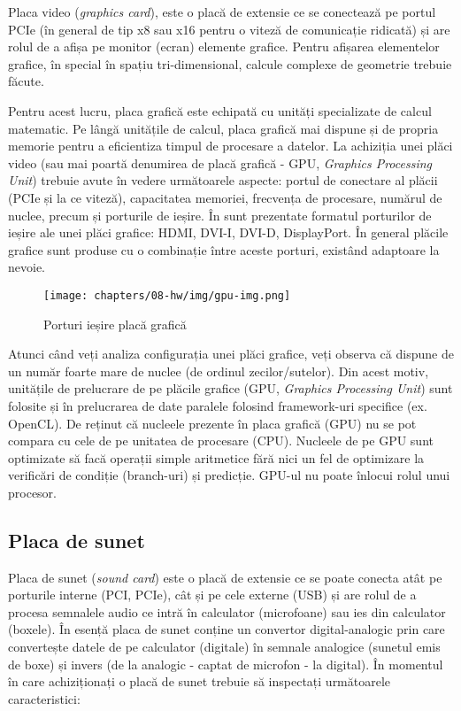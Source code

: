 Placa video (\textit{graphics card}), este o placă de extensie ce se conectează pe portul PCIe (în general
de tip x8 sau x16 pentru o viteză de comunicație ridicată) și are rolul de a
afișa pe monitor (ecran) elemente grafice. Pentru afișarea elementelor grafice,
în special în spațiu tri-dimensional, calcule complexe de geometrie trebuie
făcute.

Pentru acest lucru, placa grafică este echipată cu unități specializate
de calcul matematic. Pe lângă unitățile de calcul, placa grafică mai dispune și
de propria memorie pentru a eficientiza timpul de procesare a datelor. La
achiziția unei plăci video (sau mai poartă denumirea de placă grafică - GPU, \textit{Graphics Processing Unit}) trebuie avute în vedere următoarele
aspecte: portul de conectare al plăcii (PCIe și la ce viteză), capacitatea
memoriei, frecvența de procesare, numărul de nuclee, precum și porturile de
ieșire. În  sunt prezentate formatul
porturilor de ieșire ale unei plăci grafice: HDMI, DVI-I, DVI-D, DisplayPort. În
general plăcile grafice sunt produse cu o combinație între aceste porturi,
existând adaptoare la nevoie.

\begin{figure}[!htbp]
  \centering
  \texttt{[image: chapters/08-hw/img/gpu-img.png]}
  \caption{Porturi ieșire placă grafică\protect\footnotemark}
  \label{fig:hw:gpu}
\end{figure}

Atunci când veți analiza configurația unei plăci grafice, veți observa că
dispune de un număr foarte mare de nuclee (de ordinul zecilor/sutelor). Din
acest motiv, unitățile de prelucrare de pe plăcile grafice (GPU, \textit{Graphics Processing Unit}) sunt folosite și în prelucrarea de date
paralele folosind framework-uri specifice (ex. OpenCL). De reținut că nucleele
prezente în placa grafică (GPU) nu se pot compara cu cele de pe unitatea de
procesare (CPU). Nucleele de pe GPU sunt optimizate să facă operații simple
aritmetice fără nici un fel de optimizare la verificări de condiție (branch-uri)
și predicție. GPU-ul nu poate înlocui rolul unui procesor.

\subsection{Placa de sunet}
\label{sec:hw:extension:sound}

Placa de sunet (\textit{sound card}) este o placă de extensie ce se poate conecta atât pe porturile
interne (PCI, PCIe), cât și pe cele externe (USB) și are rolul de a procesa
semnalele audio ce intră în calculator (microfoane) sau ies din calculator
(boxele). În esență placa de sunet conține un convertor digital-analogic prin
care convertește datele de pe calculator (digitale) în semnale analogice
(sunetul emis de boxe) și invers (de la analogic - captat de microfon - la
digital). În momentul în care achiziționați o placă de sunet trebuie să
inspectați următoarele caracteristici:


